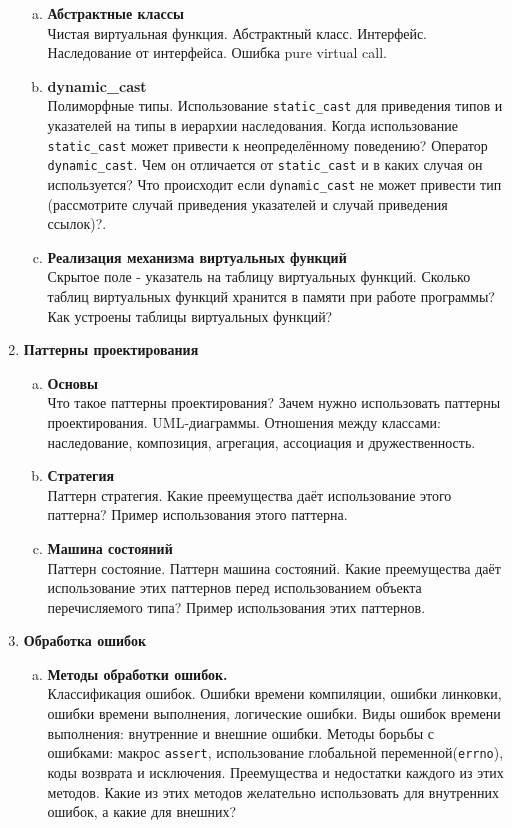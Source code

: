 \documentclass{article}
\begin{document}
\begin{enumerate}
\begin{enumerate}[a.]
\item \textbf{Абстрактные классы}\\
Чистая виртуальная функция. Абстрактный класс. Интерфейс. Наследование от интерфейса. Ошибка pure virtual call.

\item \textbf{dynamic\_cast}\\
Полиморфные типы.  Использование \texttt{static\_cast} для приведения типов и указателей на типы в иерархии наследования. Когда использование \texttt{static\_cast} может привести к неопределённому поведению? Оператор \texttt{dynamic\_cast}. Чем он отличается от \texttt{static\_cast} и в каких случая он используется? Что происходит если \texttt{dynamic\_cast} не может привести тип (рассмотрите случай приведения указателей и случай приведения ссылок)?.


\item \textbf{Реализация механизма виртуальных функций}\\
Скрытое поле - указатель на таблицу виртуальных функций.
Сколько таблиц виртуальных функций хранится в памяти при работе программы? Как устроены таблицы виртуальных функций?
\end{enumerate}




\item \textbf{Паттерны проектирования}
\begin{enumerate}[a.]
\item \textbf{Основы}\\
Что такое паттерны проектирования? Зачем нужно использовать паттерны проектирования. UML-диаграммы. Отношения между классами: наследование, композиция, агрегация, ассоциация и дружественность.


\item \textbf{Стратегия}\\
Паттерн стратегия. Какие преемущества даёт использование этого паттерна? Пример использования этого паттерна.

\item \textbf{Машина состояний}\\
Паттерн состояние. Паттерн машина состояний. Какие преемущества даёт использование этих паттернов перед использованием объекта перечисляемого типа?  Пример использования этих паттернов.
\end{enumerate}


\item \textbf{Обработка ошибок}
\begin{enumerate}[a.]
\item \textbf{Методы обработки ошибок.}\\
Классификация ошибок. Ошибки времени компиляции, ошибки линковки, ошибки времени выполнения, логические ошибки.
Виды ошибок времени выполнения: внутренние и внешние ошибки. Методы борьбы с ошибками: макрос \texttt{assert}, использование глобальной переменной(\texttt{errno}), коды возврата и исключения. Преемущества и недостатки каждого из этих методов. Какие из этих методов желательно использовать для внутренних ошибок, а какие для внешних?



\end{enumerate}
\end{enumerate}
\end{document}
